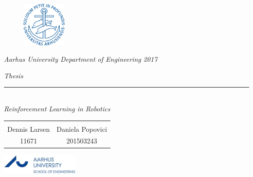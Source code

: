 \thispagestyle{empty}

\begin{figure}[H]
	\raggedleft
	\includegraphics[width=0.2\textwidth]{Figures/Aarhus_University_logo.png}
\end{figure}

\begin{center}
\textsl{Aarhus University Department of Engineering 2017 } \\ \vspace{0.5cm}

\phantom{hul}

\textsl{\HUGE Thesis } \\ \vspace{0cm}
\rule{15cm}{0.5mm}  \\ \vspace{0.5cm}
\textsl{\LARGE  Reinforcement Learning in Robotics} \\ \vspace{0.5cm}

\vspace{0.5cm}




\vspace{0.7cm}

\begin{table}[H]
	\centering
		\begin{tabular}{c c}
			\underline{\phantom{mmmmmmmmmmmmmmmm}} & \underline{\phantom{mmmmmmmmmmmmmmmm}}  
			\\
			 Dennis Larsen		& Daniela Popovici 	
			 \\
			 11671				& 201503243																	
		\end{tabular}
\end{table}
\end{center}

\newpage

{}


\begin{minipage}[t]{0.48\textwidth}
\vspace*{14pt}			%
\vspace{1.2cm}
\includegraphics[height=1cm]{Figures/au_ingenioerhoejskolen_en_logo.jpg} 
\end{minipage}
\hfill

